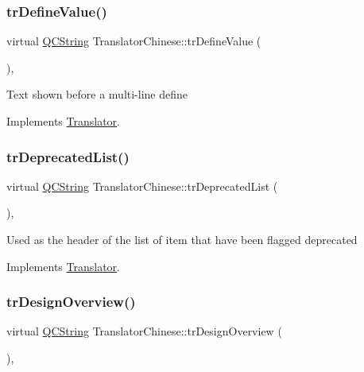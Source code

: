 \subsubsection{\texorpdfstring{trDefineValue()}{trDefineValue()}}
{\footnotesize\ttfamily virtual \mbox{\hyperlink{class_q_c_string}{Q\+C\+String}} Translator\+Chinese\+::tr\+Define\+Value (\begin{DoxyParamCaption}{ }\end{DoxyParamCaption})\hspace{0.3cm}{\ttfamily [inline]}, {\ttfamily [virtual]}}

Text shown before a multi-\/line define 

Implements \mbox{\hyperlink{class_translator}{Translator}}.

\mbox{\label{class_translator_chinese_ad6459a83eadd7cbd8c41f9305f8983b3}} 
\subsubsection{\texorpdfstring{trDeprecatedList()}{trDeprecatedList()}}
{\footnotesize\ttfamily virtual \mbox{\hyperlink{class_q_c_string}{Q\+C\+String}} Translator\+Chinese\+::tr\+Deprecated\+List (\begin{DoxyParamCaption}{ }\end{DoxyParamCaption})\hspace{0.3cm}{\ttfamily [inline]}, {\ttfamily [virtual]}}

Used as the header of the list of item that have been flagged deprecated 

Implements \mbox{\hyperlink{class_translator}{Translator}}.

\mbox{\label{class_translator_chinese_ab87b8ec483b194f324179da30953da9d}} 
\subsubsection{\texorpdfstring{trDesignOverview()}{trDesignOverview()}}
{\footnotesize\ttfamily virtual \mbox{\hyperlink{class_q_c_string}{Q\+C\+String}} Translator\+Chinese\+::tr\+Design\+Overview (\begin{DoxyParamCaption}{ }\end{DoxyParamCaption})\hspace{0.3cm}{\ttfamily [inline]}, {\ttfamily [virtual]}}

